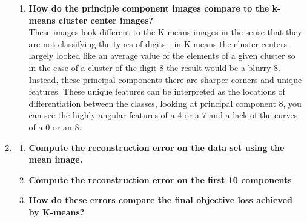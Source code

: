 \documentclass[submit]{harvardml}
\begin{document}
\begin{enumerate}
\begin{enumerate}
        \item \textbf{How do the principle component images compare to the k-means cluster center images?}\\
        These images look different to the K-means images in the sense that they are not classifying the types of digits - in K-means the cluster centers largely looked like an average value of the elements of a given cluster so in the case of a cluster of the digit $8$ the result would be a blurry $8$. Instead, these principal components there are sharper corners and unique features. These unique features can be interpreted as the locations of differentiation between the classes, looking at principal component 8, you can see the highly angular features of a 4 or a 7 and a lack of the curves of a 0 or an 8.
    \end{enumerate}
    
    \item 
    \begin{enumerate}
        \item \textbf{Compute the reconstruction error on the data set using the mean image.}
        \item \textbf{Compute the reconstruction error on the first 10 components}
        \item \textbf{How do these errors compare the final objective loss achieved by K-means?}
    \end{enumerate}
    
\end{enumerate}

\newpage
\end{document}
